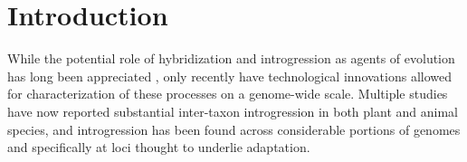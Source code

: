 
\begin{center}
\end{center}
%
%

\section*{Introduction}

While the potential role of hybridization and introgression as agents of evolution has long been appreciated \citep{Anderson1948, Anderson1954, Stebbins1959}, only recently have technological innovations allowed for characterization of these processes on a genome-wide scale. 
Multiple studies have now reported substantial inter-taxon introgression in both plant \citep{Hufford2013, renaut2013} and animal \citep{consortiumbutterfly2012, staubach2012, huerta2014} species, and introgression has been found across considerable portions of genomes and specifically at loci thought to underlie adaptation. 

